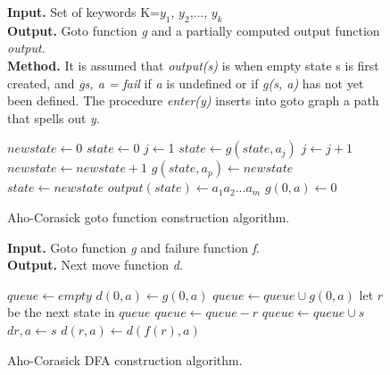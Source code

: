 \documentclass[thesis=M,english]{FITthesis}[2011/07/15]
\begin{document}
\begin{figure}[h]
\textbf{Input.} Set of keywords K={$y_1$, $y_2$,..., $y_k$} \\
\textbf{Output.} Goto function \emph{g} and a partially computed output function \emph{output}.\\
\textbf{Method.} It is assumed that \emph{output(s)} is when empty state s is first created, and \emph{g{s, a} = fail} if \emph{a} is undefined or if \emph{g(s, a)} has not yet been defined. The procedure \emph{enter(y)} inserts into goto graph a path that spells out \emph{y}.
\begin{algorithmic}
\STATE $newstate \leftarrow$0
\STATE $state \leftarrow$0
\STATE $j \leftarrow$1
\STATE $state \leftarrow g(state, a_j)$
\STATE $j \leftarrow j+1$
\ENDWHILE
{}
\STATE $newstate \leftarrow newstate+1$
\STATE $g(state, a_p) \leftarrow newstate$
\STATE $state \leftarrow newstate$
\ENDFOR
\STATE $output(state) \leftarrow {a_1a_2 ... a_m}$
\ENDFOR
{}
\STATE $g(0, a) \leftarrow$0
\ENDFOR
\end{algorithmic}
\caption{Aho-Corasick goto function construction algorithm.}
\label{fig:ac_goto_pseudocode}
\end{figure}

\begin{figure}[h]
\textbf{Input.} Goto function \emph{g} and failure function \emph{f}. \\
\textbf{Output.} Next move function \emph{d}.\\
\begin{algorithmic}
\STATE $queue \leftarrow empty$
\STATE $d(0, a) \leftarrow g(0, a)$
\STATE $queue \leftarrow queue \cup g(0, a)$
\ENDIF
\ENDFOR
{}
\STATE let $r$ be the next state in $queue$
\STATE $queue \leftarrow queue - {r}$
\STATE $queue \leftarrow queue \cup {s}$
\STATE $d{r, a} \leftarrow s$
\ELSE
\STATE $d(r, a) \leftarrow d(f(r), a)$
\ENDIF
\ENDFOR
\ENDWHILE
\end{algorithmic}
\caption{Aho-Corasick DFA construction algorithm.}
\label{fig:ac_dfa_pseudocode}
\end{figure}
\end{document}
